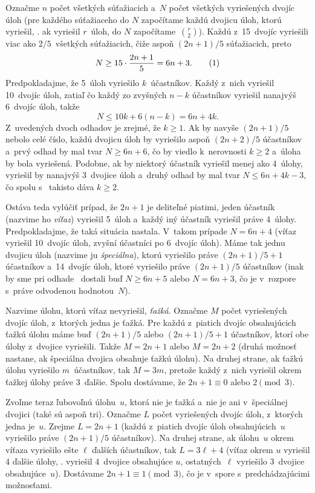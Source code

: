 {%
Označme $n$ počet všetkých súťažiacich a~$N$ počet všetkých vyriešených dvojíc úloh (pre každého súťažiaceho do $N$ započítame každú dvojicu úloh, ktorú vyriešil, \tj. ak vyriešil $r$~úloh, do $N$ započítame~$\binom r2$). Každú z~15~dvojíc vyriešili viac ako $2/5$~všetkých súťažiacich, čiže aspoň $(2n+1)/5$ súťažiacich, preto
$$
N \ge 15\cdot\frac{2n+1}5 = 6n+3.
\tag1
$$
Predpokladajme, že 5~úloh vyriešilo $k$~účastníkov. Každý z~nich vyriešil 10~dvojíc úloh, zatiaľ čo každý zo zvyšných $n-k$ účastníkov vyriešil nanajvýš 6~dvojíc úloh, takže
$$
N \le 10k + 6(n-k) = 6n+4k.
$$
Z~uvedených dvoch odhadov je zrejmé, že $k\ge1$. Ak by navyše $(2n+1)/5$ nebolo celé číslo, každú dvojicu úloh by vyriešilo aspoň $(2n+2)/5$ účastníkov a~prvý odhad by mal tvar $N\ge6n+6$, čo by viedlo k~nerovnosti $k\ge2$ a~úloha by bola vyriešená. Podobne, ak by niektorý účastník vyriešil menej ako 4~úlohy, vyriešil by nanajvýš 3~dvojice úloh a~druhý odhad by mal tvar $N\le6n+4k-3$, čo spolu s~ takisto dáva $k\ge2$.

Ostáva teda vylúčiť prípad, že $2n+1$ je deliteľné piatimi, jeden účastník (nazvime ho {\it víťaz}) vyriešil 5~úloh a~každý iný účastník vyriešil práve 4~úlohy. Predpokladajme, že taká situácia nastala. V~takom prípade $N=6n+4$ (víťaz vyriešil 10~dvojíc úloh, zvyšní účastníci po 6~dvojíc úloh). Máme tak jednu dvojicu úloh (nazvime ju {\it špeciálna}), ktorú vyriešilo práve $(2n+1)/5+1$ účastníkov a~14~dvojíc úloh, ktoré vyriešilo práve $(2n+1)/5$ účastníkov (inak by sme pri odhade~ dostali buď $N\ge6n+5$ alebo $N=6n+3$, čo je v~rozpore s~práve odvodenou hodnotou~$N$).

Nazvime úlohu, ktorú víťaz nevyriešil, {\it ťažká}. Označme $M$ počet vyriešených dvojíc úloh, z~ktorých jedna je ťažká. Pre každú z~piatich dvojíc obsahujúcich ťažkú úlohu máme buď $(2n+1)/5$ alebo $(2n+1)/5+1$ účastníkov, ktorí obe úlohy z~dvojice vyriešili. Takže $M=2n+1$ alebo $M=2n+2$ (druhá možnosť nastane, ak špeciálna dvojica obsahuje ťažkú úlohu). Na druhej strane, ak ťažkú úlohu vyriešilo $m$~účastníkov, tak $M=3m$, pretože každý z~nich vyriešil okrem ťažkej úlohy práve 3~ďalšie. Spolu dostávame, že $2n+1\equiv0$ alebo $2\pmod3$.

Zvoľme teraz ľubovoľnú úlohu~$u$, ktorá nie je ťažká a~nie je ani v~špeciálnej dvojici (také sú aspoň tri). Označme $L$ počet vyriešených dvojíc úloh, z~ktorých jedna je~$u$. Zrejme $L=2n+1$ (každú z~piatich dvojíc úloh obsahujúcich~$u$ vyriešilo práve $(2n+1)/5$ účastníkov). Na druhej strane, ak úlohu~$u$ okrem víťaza vyriešilo ešte $\ell$ ďalších účastníkov, tak $L=3\ell+4$ (víťaz okrem $u$ vyriešil 4 ďalšie úlohy, \tj. vyriešil 4~dvojice obsahujúce $u$, ostatných~$\ell$ vyriešilo 3~dvojice obsahujúce~$u$). Dostávame $2n+1\equiv1\pmod3$, čo je v~spore s~predchádzajúcimi možnosťami.
}

